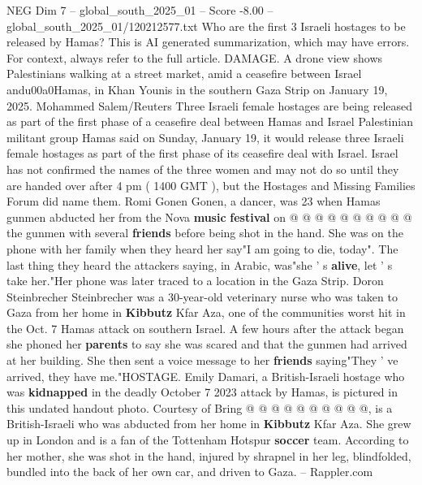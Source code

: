 \begin{textsample}{NEG Dim 7 – global\_south\_2025\_01 – Score -8.00 – global\_south\_2025\_01/120212577.txt}  \label{ex:f7_neg_194}
Who are the first 3 Israeli hostages to be released by Hamas?
This is AI generated summarization, which may have errors.
For context, always refer to the full article.
DAMAGE.
A drone view shows Palestinians walking at a street market, amid a ceasefire between Israel andu00a0Hamas, in Khan Younis in the southern Gaza Strip on January 19, 2025.
Mohammed Salem/Reuters Three Israeli female hostages are being released as part of the first phase of a ceasefire deal between Hamas and Israel Palestinian militant group Hamas said on Sunday, January 19, it would release three Israeli female hostages as part of the first phase of its ceasefire deal with Israel.
Israel has not confirmed the names of the three women and may not do so until they are handed over after 4 pm ( 1400 GMT ), but the Hostages and Missing Families Forum did name them.
Romi Gonen Gonen, a dancer, was 23 when Hamas gunmen abducted her from the Nova \textbf{music} \textbf{festival} on @ @ @ @ @ @ @ @ @ @ the gunmen with several \textbf{friends} before being shot in the hand.
She was on the phone with her family when they heard her say"I am going to die, today".
The last thing they heard the attackers saying, in Arabic, was"she ' s \textbf{alive}, let ' s take her."Her phone was later traced to a location in the Gaza Strip.
Doron Steinbrecher Steinbrecher was a 30-year-old veterinary nurse who was taken to Gaza from her home in \textbf{Kibbutz} Kfar Aza, one of the communities worst hit in the Oct. 7 Hamas attack on southern Israel.
A few hours after the attack began she phoned her \textbf{parents} to say she was scared and that the gunmen had arrived at her building.
She then sent a voice message to her \textbf{friends} saying"They ' ve arrived, they have me."HOSTAGE.
Emily Damari, a British-Israeli hostage who was \textbf{kidnapped} in the deadly October 7 2023 attack by Hamas, is pictured in this undated handout photo.
Courtesy of Bring @ @ @ @ @ @ @ @ @ @, is a British-Israeli who was abducted from her home in \textbf{Kibbutz} Kfar Aza.
She grew up in London and is a fan of the Tottenham Hotspur \textbf{soccer} team.
According to her mother, she was shot in the hand, injured by shrapnel in her leg, blindfolded, bundled into the back of her own car, and driven to Gaza. -- Rappler.com

\end{textsample}
